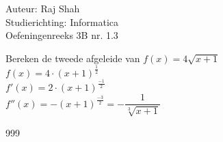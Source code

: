 \documentclass[a4paper]{article}
\begin{document}
  
\noindent \large Auteur: Raj Shah \\
\noindent \large Studierichting: Informatica\\
\noindent \large Oefeningenreeks 3B nr. 1.3\\

\medskip

\normalsize
Bereken de tweede afgeleide van $f(x) = 4\sqrt{x + 1}$\\

$f(x) = 4 \cdot (x + 1)^{\tfrac{1}{2}}$\\

$f'(x) = 2 \cdot (x + 1)^{\tfrac{-1}{2}}$\\

$f''(x) = -(x + 1)^{\tfrac{-3}{2}} = -\dfrac{1}{\sqrt[3]{x+1}}$\\




\begin{thebibliography}{999}
\end{thebibliography}
\end{document}
